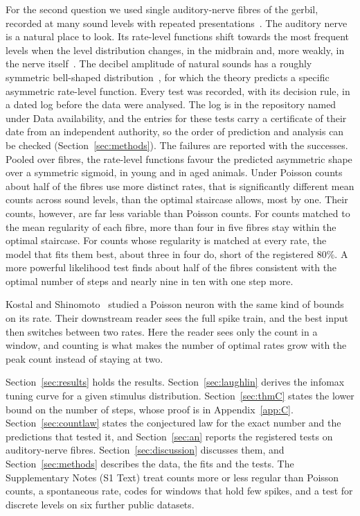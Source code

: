 \documentclass[10pt,letterpaper]{article}
\begin{document}
For the second question we used single auditory-nerve fibres of the gerbil, recorded at many sound levels with repeated
presentations~\cite{Heeringa2024}. The auditory nerve is a natural place to look. Its rate-level functions shift towards the most
frequent levels when the level distribution changes, in the midbrain and, more weakly, in the nerve itself~\cite{Wen2009}. The
decibel amplitude of natural sounds has a roughly symmetric bell-shaped distribution~\cite{Escabi2003}, for which the theory predicts a
specific asymmetric rate-level function. Every test was recorded, with its decision rule, in a dated log before the data were analysed.
The log is in the repository named under Data availability, and the entries for these tests carry a certificate of their date
from an independent authority, so the order of prediction and analysis can be checked (Section~\ref{sec:methods}). The failures are
reported with the successes. Pooled over fibres, the rate-level functions favour the predicted asymmetric shape over a symmetric sigmoid, in young and in aged animals.
Under Poisson counts about half of the fibres use more distinct rates, that is significantly different mean counts across sound
levels, than the optimal staircase allows, most by one. Their counts, however, are far less variable than
Poisson counts. For counts matched to the mean regularity of each fibre, more than four in five fibres stay within the optimal
staircase. For counts whose regularity is matched at every rate, the model that fits them best, about three in four do, short of the
registered $80\%$. A more powerful likelihood test finds about half of the fibres consistent with the optimal number of steps and nearly nine in ten
with one step more.

Kostal and Shinomoto~\cite{KostalShinomoto2016} studied a Poisson neuron with the same kind of bounds on its rate. Their downstream
reader sees the full spike train, and the best input then switches between two rates. Here the reader sees only the count in a
window, and counting is what makes the number of optimal rates grow with the peak count instead of staying at two.

Section~\ref{sec:results} holds the results. Section~\ref{sec:laughlin} derives the infomax tuning curve for a given stimulus
distribution. Section~\ref{sec:thmC} states the lower bound on the number of steps, whose proof is in Appendix~\ref{app:C}.
Section~\ref{sec:countlaw} states the conjectured law for the exact number and the predictions that tested it, and Section~\ref{sec:an}
reports the registered tests on auditory-nerve fibres. Section~\ref{sec:discussion} discusses them, and Section~\ref{sec:methods}
describes the data, the fits and the tests. The Supplementary Notes (S1 Text) treat counts more or less regular than Poisson counts, a
spontaneous rate, codes for windows that hold few spikes, and a test for discrete levels on six further public datasets.
\end{document}
